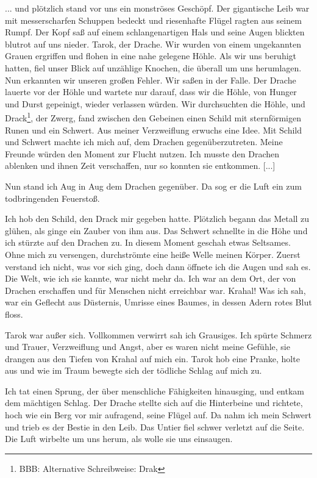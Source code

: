 \documentclass[10pt, a4paper, oneside]{book}
\begin{document}
\begin{multicols}{2}
... und plötzlich stand vor uns ein monströses Geschöpf. Der gigantische Leib war mit messerscharfen Schuppen bedeckt und riesenhafte Flügel ragten aus seinem Rumpf. Der Kopf saß auf einem schlangenartigen Hals und seine Augen blickten blutrot auf uns nieder. Tarok, der Drache. Wir wurden von einem ungekannten Grauen ergriffen und flohen in eine nahe gelegene Höhle. Als wir uns beruhigt hatten, fiel unser Blick auf unzählige Knochen, die überall um uns herumlagen. Nun erkannten wir unseren großen Fehler. Wir saßen in der Falle. Der Drache lauerte vor der Höhle und wartete nur darauf, dass wir die Höhle, von Hunger und Durst gepeinigt, wieder verlassen würden. Wir durchsuchten die Höhle, und Drack\footnote{BBB: Alternative Schreibweise: Drak}, der Zwerg, fand zwischen den Gebeinen einen Schild mit sternförmigen Runen und ein Schwert. Aus meiner Verzweiflung erwuchs eine Idee. Mit Schild und Schwert machte ich mich auf, dem Drachen gegenüberzutreten. Meine Freunde würden den Moment zur Flucht nutzen. Ich musste den Drachen ablenken und ihnen Zeit verschaffen, nur so konnten sie entkommen. [...]

Nun stand ich Aug in Aug dem Drachen gegenüber. Da sog er die Luft ein zum todbringenden Feuerstoß. 

Ich hob den Schild, den Drack mir gegeben hatte. Plötzlich begann das Metall zu glühen, als ginge ein Zauber von ihm aus. Das Schwert schnellte in die Höhe und ich stürzte auf den Drachen zu. In diesem Moment geschah etwas Seltsames. Ohne mich zu versengen, durchströmte eine heiße Welle meinen Körper. Zuerst verstand ich nicht, was vor sich ging, doch dann öffnete ich die Augen und sah es. Die Welt, wie ich sie kannte, war nicht mehr da. Ich war an dem Ort, der von Drachen erschaffen und für Menschen nicht erreichbar war. Krahal! Was ich sah, war ein Geflecht aus Düsternis, Umrisse eines Baumes, in dessen Adern rotes Blut floss.
    
Tarok war außer sich. Vollkommen verwirrt sah ich Grausiges. Ich spürte Schmerz und Trauer, Verzweiflung und Angst, aber es waren nicht meine Gefühle, sie drangen aus den Tiefen von Krahal auf mich ein. Tarok hob eine Pranke, holte aus und wie im Traum bewegte sich der tödliche Schlag auf mich zu. 

Ich tat einen Sprung, der über menschliche Fähigkeiten hinausging, und entkam dem mächtigen Schlag. Der Drache stellte sich auf die Hinterbeine und richtete, hoch wie ein Berg vor mir aufragend, seine Flügel auf. Da nahm ich mein Schwert und trieb es der Bestie in den Leib. Das Untier fiel schwer verletzt auf die Seite. Die Luft wirbelte um uns herum, als wolle sie uns einsaugen. 
    

\end{multicols}
\end{document}
